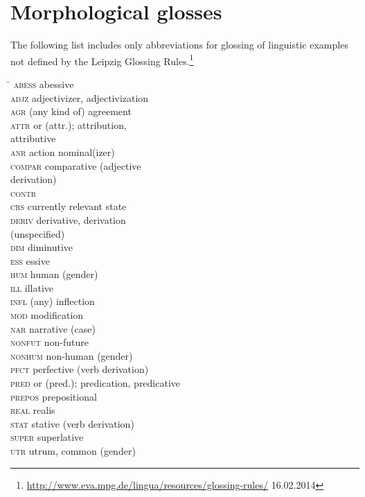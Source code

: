 

\section{Morphological glosses}
The following list includes only abbreviations for glossing of linguistic examples not defined by the Leipzig Glossing Rules.\footnote{\url{http://www.eva.mpg.de/lingua/resources/glossing-rules/} 16.02.2014}
\begin{multicols}{2}
\begin{tabbing}
\TABh \= \kill
\textsc{abess} \> abessive\\
\textsc{adjz} \> adjectivizer, adjectivization\\
\textsc{agr} \> (any kind of) agreement\\
\textsc{attr} \> or (attr.); attribution,\\ \> attributive\\
\textsc{anr} \> action nominal(izer)\\
\textsc{compar} \> comparative (adjective\\ \> derivation)\\
\textsc{contr} \> \\
\textsc{crs} \> currently relevant state\\
\textsc{deriv} \> derivative, derivation\\ \> (unspecified)\\
\textsc{dim} \> diminutive\\
\textsc{ess} \> essive\\
\textsc{hum} \> human (gender)\\
\textsc{ill} \> illative\\
\textsc{infl} \> (any) inflection\\
\textsc{mod} \> modification\\
\textsc{nar} \> narrative (case)\\
\textsc{nonfut} \> non-future\\
\textsc{nonhum} \> non-human (gender)\\
\textsc{pfct} \> perfective (verb derivation)\\
\textsc{pred} \> or (pred.); predication, predicative\\
\textsc{prepos} \> prepositional\\
\textsc{real} \> realis\\
\textsc{stat} \> stative (verb derivation)\\
\textsc{super} \> superlative\\
\textsc{utr} \> utrum, common (gender)
\end{tabbing}
\end{multicols}

